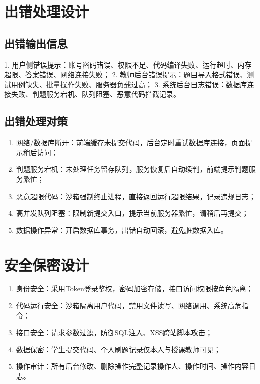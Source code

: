 \documentclass{../template/softeng}
\begin{document}
\section{出错处理设计}
\subsection{出错输出信息}
1. 用户侧错误提示：账号密码错误、权限不足、代码编译失败、运行超时、内存超限、答案错误、网络连接失败；
2. 教师后台错误提示：题目导入格式错误、测试用例缺失、批量操作失败、服务器负载过高；
3. 系统后台日志错误：数据库连接失败、判题服务宕机、队列阻塞、恶意代码拦截记录。

\subsection{出错处理对策}
\begin{enumerate}
    \item 网络/数据库断开：前端缓存未提交代码，后台定时重试数据库连接，页面提示稍后访问；
    \item 判题服务宕机：未处理任务留存队列，服务恢复后自动续判，前端提示判题服务繁忙；
    \item 恶意超限代码：沙箱强制终止进程，直接返回运行超限结果，记录违规日志；
    \item 高并发队列阻塞：限制新提交入口，提示当前服务器繁忙，请稍后再提交；
    \item 数据操作异常：开启数据库事务，出错自动回滚，避免脏数据入库。
\end{enumerate}

\section{安全保密设计}
\begin{enumerate}
    \item 身份安全：采用Token登录鉴权，密码加密存储，接口访问权限按角色隔离；
    \item 代码运行安全：沙箱隔离用户代码，禁用文件读写、网络调用、系统高危指令；
    \item 接口安全：请求参数过滤，防御SQL注入、XSS跨站脚本攻击；
    \item 数据保密：学生提交代码、个人刷题记录仅本人与授课教师可见；
    \item 操作审计：所有后台修改、删除操作完整记录操作人、操作时间、操作内容日志。
\end{enumerate}
\end{document}
